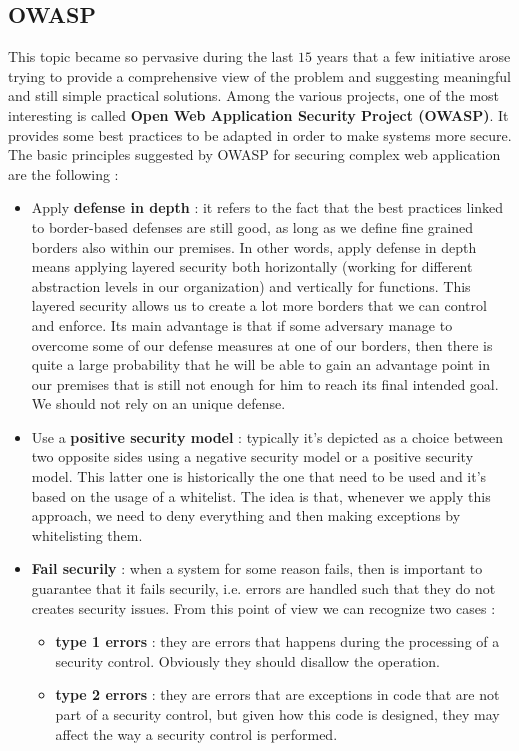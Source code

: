 \subsection{OWASP}
This topic became so pervasive during the last $15$ years that a few initiative arose trying to provide a comprehensive view of the problem and suggesting meaningful and still simple practical solutions. Among the various projects, one of the most interesting is called \textbf{Open Web Application Security Project (OWASP)}. It provides some best practices to be adapted in order to make systems more secure. The basic principles suggested by OWASP for securing complex web application are the following :
\begin{itemize}
\item Apply \textbf{defense in depth} : it refers to the fact that the best practices linked to border-based defenses are still good, as long as we define fine grained borders also within our premises. In other words, apply defense in depth means applying layered security both horizontally (working for different abstraction levels in our organization) and vertically for functions. This layered security allows us to create a lot more borders that we can control and enforce. Its main advantage is that if some adversary manage to overcome some of our defense measures at one of our borders, then there is quite a large probability that he will be able to gain an advantage point in our premises that is still not enough for him to reach its final intended goal. We should not rely on an unique defense.
\item Use a \textbf{positive security model} : typically it's depicted as a choice between two opposite sides using a negative security model or a positive security model. This latter one is historically the one that need to be used and it's based on the usage of a whitelist. The idea is that, whenever we apply this approach, we need to deny everything and then making exceptions by whitelisting them.
\item \textbf{Fail securily} : when a system for some reason fails, then is important to guarantee that it fails securily, i.e. errors are handled such that they do not creates security issues. From this point of view we can recognize two cases :
\begin{itemize}
\item \textbf{type 1 errors} : they are errors that happens during the processing of a security control. Obviously they should disallow the operation.
\item \textbf{type 2 errors} : they are errors that are exceptions in code that are not part of a security control, but given how this code is designed, they may affect the way a security control is performed.

\end{itemize}
\end{itemize}
